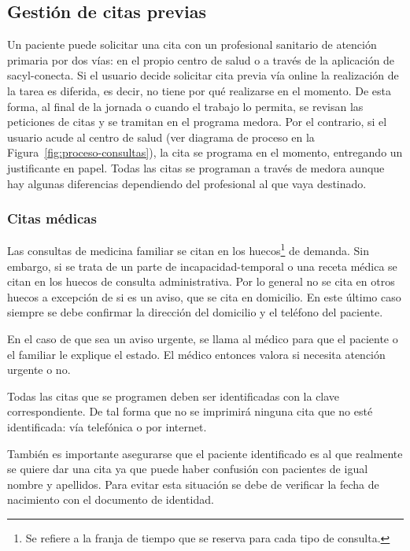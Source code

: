 \subsection{Gestión de citas previas}

Un paciente puede solicitar una cita con un profesional sanitario de atención primaria por dos vías: en el propio centro de salud o a través de la aplicación de \Gls{sacyl-conecta}.
Si el usuario decide solicitar cita previa vía online la realización de la tarea es diferida, es decir, no tiene por qué realizarse en el momento.
De esta forma, al final de la jornada o cuando el trabajo lo permita, se revisan las peticiones de citas y se tramitan en el programa \Gls{medora}.
Por el contrario, si el usuario acude al centro de salud (ver diagrama de proceso en la Figura~\ref{fig:proceso-consultas}), la cita se programa en el momento, entregando un justificante en papel.
Todas las citas se programan a través de \Gls{medora} aunque hay algunas diferencias dependiendo del profesional al que vaya destinado.

\subsubsection{Citas médicas}

Las consultas de medicina familiar se citan en los huecos\footnote{Se refiere a la franja de tiempo que se reserva para cada tipo de consulta.} de demanda.
Sin embargo, si se trata de un parte de \gls{incapacidad-temporal} o una receta médica se citan en los huecos de consulta administrativa.
Por lo general no se cita en otros huecos a excepción de si es un aviso, que se cita en domicilio.
En este último caso siempre se debe confirmar la dirección del domicilio y el teléfono del paciente.

En el caso de que sea un aviso urgente, se llama al médico para que el paciente o el familiar le explique el estado.
El médico entonces valora si necesita atención urgente o no.

Todas las citas que se programen deben ser identificadas con la clave correspondiente.
De tal forma que no se imprimirá ninguna cita que no esté identificada: vía telefónica o por internet.

También es importante asegurarse que el paciente identificado es al que realmente se quiere dar una cita ya que puede haber confusión con pacientes de igual nombre y apellidos.
Para evitar esta situación se debe de verificar la fecha de nacimiento con el documento de identidad.

